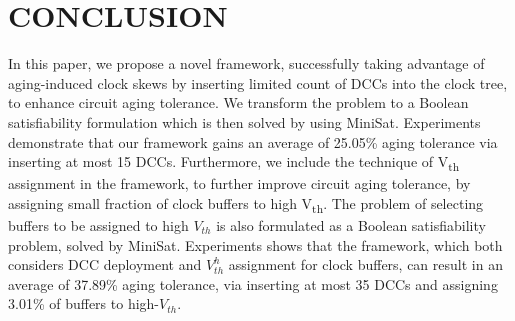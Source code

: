 \section{CONCLUSION}
\label{sec:conclude}
In this paper, we propose a novel framework, successfully taking advantage of aging-induced clock skews by inserting limited count of DCCs into the clock tree, to enhance circuit aging tolerance. We transform the problem to a Boolean satisfiability formulation which is then solved by using MiniSat. Experiments demonstrate that our framework gains an average of 25.05\% aging tolerance via inserting at most 15 DCCs. Furthermore, we include the technique of V\textsubscript{th} assignment in the framework, to further improve circuit aging tolerance, by assigning small fraction of clock buffers to high V\textsubscript{th}. The problem of selecting buffers to be assigned to high $V_{th}$ is also formulated as a Boolean satisfiability problem, solved by MiniSat. Experiments shows that the framework, which both considers DCC deployment and $V_{th}^h$ assignment for clock buffers, can result in an average of 37.89\% aging tolerance, via inserting at most 35 DCCs and assigning 3.01\% of buffers to high-$V_{th}$.


